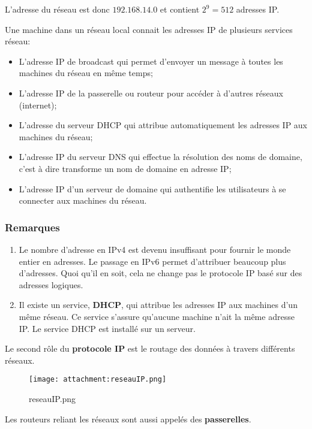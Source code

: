 \documentclass[11pt]{article}
\providecommand{\tightlist}{%
      \setlength{\itemsep}{0pt}\setlength{\parskip}{0pt}}
\begin{document}
    L'adresse du réseau est donc \(192.168.14.0\) et contient \(2^{9}=512\)
adresses IP.

    Une machine dans un réseau local connait les adresses IP de plusieurs
services réseau:

\begin{itemize}
\tightlist
\item
  L'adresse IP de broadcast qui permet d'envoyer un message à toutes les
  machines du réseau en même temps;
\item
  L'adresse IP de la passerelle ou routeur pour accéder à d'autres
  réseaux (internet);
\item
  L'adresse du serveur DHCP qui attribue automatiquement les adresses IP
  aux machines du réseau;
\item
  L'adresse IP du serveur DNS qui effectue la résolution des noms de
  domaine, c'est à dire transforme un nom de domaine en adresse IP;
\item
  L'adresse IP d'un serveur de domaine qui authentifie les utilisateurs
  à se connecter aux machines du réseau.
\end{itemize}

\hypertarget{remarques}{%
\subsubsection{Remarques}\label{remarques}}

\begin{enumerate}
\def\labelenumi{\arabic{enumi}.}
\item
  Le nombre d'adresse en IPv4 est devenu insuffisant pour fournir le
  monde entier en adresses. Le passage en IPv6 permet d'attribuer
  beaucoup plus d'adresses. Quoi qu'il en soit, cela ne change pas le
  protocole IP basé sur des adresses logiques.
\item
  Il existe un service, \textbf{DHCP}, qui attribue les adresses IP aux
  machines d'un même réseau. Ce service s'assure qu'aucune machine n'ait
  la même adresse IP. Le service DHCP est installé sur un serveur.
\end{enumerate}

Le second rôle du \textbf{protocole IP} est le routage des données à
travers différents réseaux.

    \begin{figure}
\centering
\texttt{[image: attachment:reseauIP.png]}
\caption{reseauIP.png}
\end{figure}

    Les routeurs reliant les réseaux sont aussi appelés des
\textbf{passerelles}.
\end{document}
